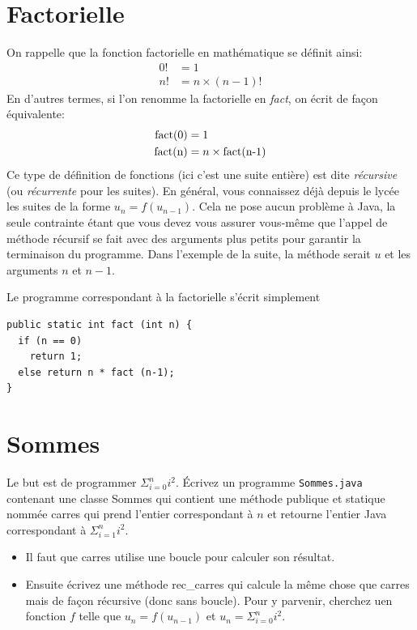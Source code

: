 \documentclass[11pt,a4paper]{article}
\newcommand{\fact}[1]{\textnormal{fact(#1)}}
\newcommand{\bitem}{\item[$\bullet$]}
\begin{document}
\section{Factorielle}

\noindent On rappelle que la fonction factorielle en mathématique se
définit ainsi:
\begin{align*}
  0! &= 1 \\
  n! &= n \times (n-1)!
\end{align*}
\noindent En d'autres termes, si l'on renomme la factorielle en
\emph{fact}, on écrit de façon équivalente:
\begin{align*}
  \fact{0} &= 1 \\
  \fact{n} &= n \times \fact{n-1}
\end{align*}
\noindent Ce type de définition de fonctions (ici c'est une suite
entière) est dite \emph{récursive} (ou \emph{récurrente} pour les
suites). En général, vous connaissez déjà depuis le lycée les suites
de la forme $u_n = f(u_{n-1})$. Cela ne pose aucun problème à
\textsf{Java}, la seule contrainte étant que vous devez vous assurer
vous-même que l'appel de méthode récursif se fait avec des arguments
plus petits pour garantir la terminaison du programme. Dans l'exemple
de la suite, la méthode serait $u$ et les arguments $n$ et $n-1$.

\medskip

\noindent Le programme correspondant à la factorielle s'écrit
simplement

{\small
\begin{verbatim}
public static int fact (int n) {
  if (n == 0)
    return 1;
  else return n * fact (n-1);
}
\end{verbatim}
}


\section{Sommes}

\noindent Le but est de programmer $\Sigma_{i=0}^{n}{i^2}$. Écrivez un
programme \texttt{Sommes.java} contenant une classe \textsf{Sommes}
qui contient une méthode publique et statique nommée \textsf{carres}
qui prend l'entier correspondant à $n$ et retourne l'entier
\textsf{Java} correspondant à $\Sigma_{i=1}^{n}{i^2}$.

\medskip

\begin{itemize}

  \bitem Il faut que \textsf{carres} utilise une boucle pour calculer
  son résultat.

  \bitem Ensuite écrivez une méthode \textsf{rec\_carres} qui calcule
  la même chose que \textsf{carres} mais de façon récursive (donc sans
  boucle). Pour y parvenir, cherchez uen fonction $f$ telle que $u_n =
  f (u_{n-1})$ et $u_n=\Sigma_{i=0}^{n}{i^2}$.

\end{itemize}
\end{document}
